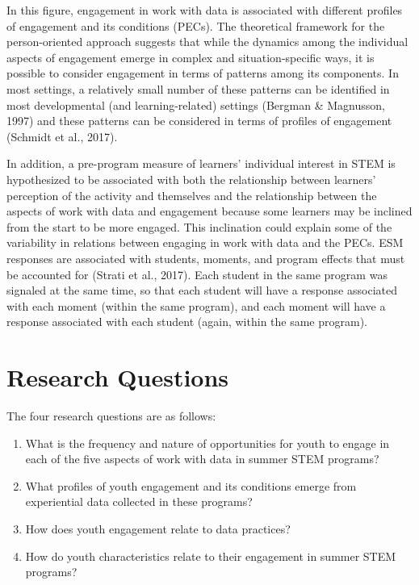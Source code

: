 \documentclass[]{book}
\providecommand{\tightlist}{%
  \setlength{\itemsep}{0pt}\setlength{\parskip}{0pt}}
\theoremstyle{definition}
\theoremstyle{definition}
\theoremstyle{definition}
\theoremstyle{remark}
\begin{document}
In this figure, engagement in work with data is associated with
different profiles of engagement and its conditions (PECs). The
theoretical framework for the person-oriented approach suggests that
while the dynamics among the individual aspects of engagement emerge in
complex and situation-specific ways, it is possible to consider
engagement in terms of patterns among its components. In most settings,
a relatively small number of these patterns can be identified in most
developmental (and learning-related) settings (Bergman \& Magnusson,
1997) and these patterns can be considered in terms of profiles of
engagement (Schmidt et al., 2017).

In addition, a pre-program measure of learners' individual interest in
STEM is hypothesized to be associated with both the relationship between
learners' perception of the activity and themselves and the relationship
between the aspects of work with data and engagement because some
learners may be inclined from the start to be more engaged. This
inclination could explain some of the variability in relations between
engaging in work with data and the PECs. ESM responses are associated
with students, moments, and program effects that must be accounted for
(Strati et al., 2017). Each student in the same program was signaled at
the same time, so that each student will have a response associated with
each moment (within the same program), and each moment will have a
response associated with each student (again, within the same program).

\section{Research Questions}\label{research-questions}

The four research questions are as follows:

\begin{enumerate}
\def\labelenumi{\arabic{enumi}.}
\tightlist
\item
  What is the frequency and nature of opportunities for youth to engage
  in each of the five aspects of work with data in summer STEM programs?
\item
  What profiles of youth engagement and its conditions emerge from
  experiential data collected in these programs?
\item
  How does youth engagement relate to data practices?
\item
  How do youth characteristics relate to their engagement in summer STEM
  programs?
\end{enumerate}
\end{document}
